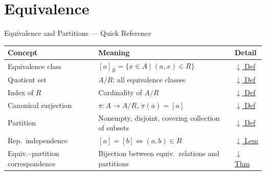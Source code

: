 \section{Equivalence}


\begin{toolkitbox}{Equivalence and Partitions --- Quick Reference}
\small
\begin{tabular}{l l l}
\toprule
\textbf{Concept} & \textbf{Meaning} & \textbf{Detail} \\
\midrule
Equivalence class  & $[a]_R = \{x \in A \mid (a,x)\in R\}$                        & \hyperref[def:equiv-class]{$\downarrow$ Def} \\
Quotient set       & $A/R$: all equivalence classes                                & \hyperref[def:quotient-set]{$\downarrow$ Def} \\
Index of $R$       & Cardinality of $A/R$                                          & \hyperref[def:index]{$\downarrow$ Def} \\
Canonical surjection & $\pi : A \to A/R$, $\pi(a) = [a]$                          & \hyperref[def:canonical-surj]{$\downarrow$ Def} \\
Partition          & Nonempty, disjoint, covering collection of subsets            & \hyperref[def:partition]{$\downarrow$ Def} \\
Rep.\ independence & $[a]=[b] \iff (a,b)\in R$                                    & \hyperref[lem:rep-independence]{$\downarrow$ Lem} \\
Equiv.--partition correspondence & Bijection between equiv.\ relations and partitions & \hyperref[thm:equiv-partition]{$\downarrow$ Thm} \\
\bottomrule
\end{tabular}
\end{toolkitbox}



